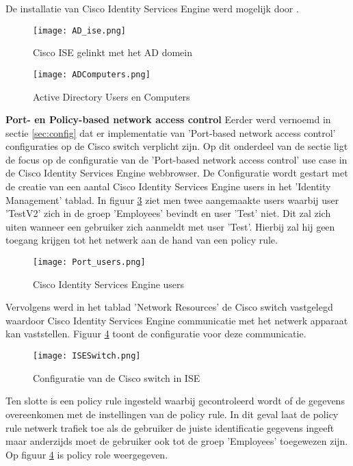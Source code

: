 De installatie van Cisco Identity Services Engine werd mogelijk door \cite{CiscoISE_InstallationGuide}.

\begin{figure}[H]
	\centering
	\texttt{[image: AD\_ise.png]}
	\caption{Cisco ISE gelinkt met het AD domein}%
	\label{fig:AD_Cisco1}%
\end{figure}

\begin{figure}[H]
	\centering
	\texttt{[image: ADComputers.png]}
	\caption{Active Directory Users en Computers}
	\label{fig:AD_Cisco2}
\end{figure}

\setlength{\parindent}{5ex}\fontsize{12}{20}\textbf{Port- en Policy-based network access control }
 \newline
	Eerder werd vernoemd in sectie \ref{sec:config} dat er implementatie van 'Port-based network access control' configuraties op de Cisco switch verplicht zijn. Op dit onderdeel van de sectie ligt de focus op de configuratie van de 'Port-based network access control' use case in de Cisco Identity Services Engine webbrowser. 
	\newline
	\newline
	De Configuratie wordt gestart met de creatie van een aantal Cisco Identity Services Engine users in het 'Identity Management' tablad. In figuur \ref{fig:users} ziet men twee aangemaakte users waarbij user 'TestV2' zich in de groep 'Employees' bevindt en user 'Test' niet. Dit zal zich uiten wanneer een gebruiker zich aanmeldt met user 'Test'. Hierbij zal hij geen toegang krijgen tot het netwerk aan de hand van een policy rule.
 	\begin{figure}[H]
 		\centering
 		\texttt{[image: Port\_users.png]}
 		\caption{Cisco Identity Services Engine users}%
 		\label{fig:users}%
 	\end{figure}
 Vervolgens werd in het tablad 'Network Resources' de Cisco switch vastgelegd waardoor Cisco Identity Services Engine communicatie met het netwerk apparaat kan vaststellen. Figuur \ref{fig:ISESwitch} toont de configuratie voor deze communicatie. 
 	
 	 	\begin{figure}[H]
 		\centering
 		\texttt{[image: ISESwitch.png]}
 		\caption{Configuratie van de Cisco switch in ISE}%
 		\label{fig:ISESwitch}%
 		\end{figure}
 	
 	Ten slotte is een policy rule ingesteld waarbij gecontroleerd wordt of de gegevens overeenkomen met de instellingen van de policy rule. In dit geval laat de policy rule netwerk trafiek toe als de gebruiker de juiste identificatie gegevens ingeeft maar anderzijds moet de gebruiker ook tot de groep 'Employees' toegewezen zijn. Op figuur \ref{fig:ISESwitch} is policy role weergegeven.
 	
